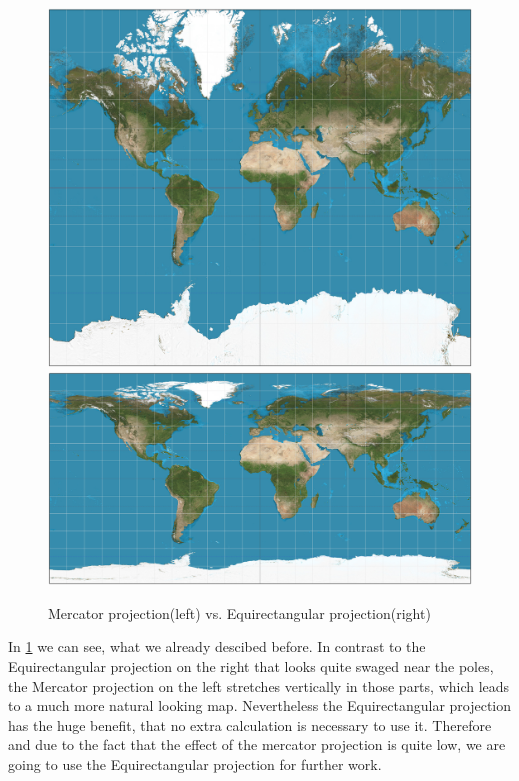 \documentclass
[
	paper = a4,
    pagesize,
	12 pt,
	oneside,                       %
    open = right,
	DIV = calc,
	BCOR = 0 mm,                   %
	bibtotoc
]
{scrbook}
\begin{document}
\begin{figure}[H]
	\includegraphics[width=.5\textwidth]{Images/Mercator_projection_SW.jpg}
	\includegraphics[width=.5\textwidth]{Images/Equirectangular_projection_SW.jpg}
\caption[]{Mercator projection(left) vs. Equirectangular projection(right)}
\label{fig:projections}
\end{figure}

In \cref{fig:projections} we can see, what we already descibed before.
In contrast to the Equirectangular projection on the right that looks quite swaged near the poles, the Mercator projection on the left stretches vertically in those parts, which leads to a much more natural looking map.
Nevertheless the Equirectangular projection has the huge benefit, that no extra calculation is necessary to use it.
Therefore and due to the fact that the effect of the mercator projection is quite low, we are going to use the Equirectangular projection for further work.
\end{document}
